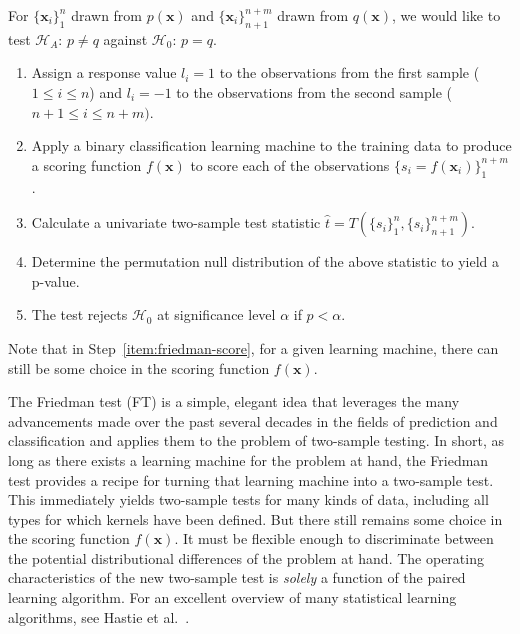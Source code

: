 For $\{\mathbf{x}_i\}_1^n$ drawn from $p(\mathbf{x})$ and
$\{\mathbf{x}_i\}_{n+1}^{n+m}$ drawn from $q(\mathbf{x})$, we would like to
test $\mathcal{H}_A$: $p \neq q$ against $\mathcal{H}_0$: $p = q$.
\begin{enumerate}
\item Assign a response value $l_i = 1$ to the observations from the
  first sample ($1 \leq i \leq n$) and $l_i = -1$ to the observations
  from the second sample ($n + 1 \leq i \leq n+m)$.
\item Apply a binary classification learning machine to the training
  data to produce a scoring function $f(\mathbf{x})$ to score each of
  the observations $\{s_i = f(\mathbf{x}_i)\}_1^{n+m}$. \label{item:friedman-score}
\item Calculate a univariate two-sample test statistic $\hat{t} =
  T(\{s_i\}_1^n,\{s_i\}_{n+1}^{n+m})$.
\item Determine the permutation null distribution of the above
  statistic to yield a p-value.
\item The test rejects $\mathcal{H}_0$ at significance level $\alpha$
  if $p < \alpha$.
\end{enumerate}

Note that in Step~\ref{item:friedman-score}, for a given learning
machine, there can still be some choice in the scoring function
$f(\mathbf{x})$.

The Friedman test (FT) is a simple, elegant idea that leverages the
many advancements made over the past several decades in the fields of
prediction and classification and applies them to the problem of
two-sample testing.  In short, as long as there exists a learning
machine for the problem at hand, the Friedman test provides a recipe
for turning that learning machine into a two-sample test.  This
immediately yields two-sample tests for many kinds of data, including
all types for which kernels have been defined.
But there still remains some choice in the scoring
function $f(\mathbf{x})$.  It must be flexible enough to discriminate
between the potential distributional differences of the problem at
hand.  The operating characteristics of the new two-sample test is
\emph{solely} a function of the paired learning algorithm.  For an
excellent overview of many statistical learning algorithms, see
Hastie et al.\ \cite{hastie2009elements}.

